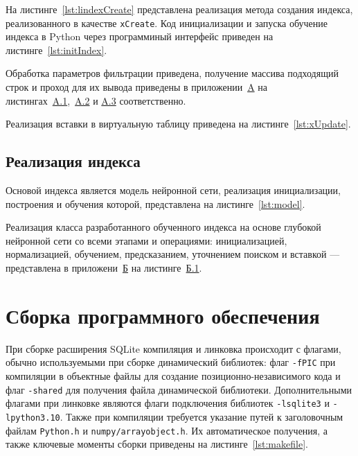 На листинге~\ref{lst:lindexCreate} представлена реализация метода создания
индекса, реализованного в качестве \texttt{xCreate}. Код инициализации и запуска
обучение индекса в Python через программиный интерфейс приведен на
листинге~\ref{lst:initIndex}.



Обработка параметров фильтрации приведена, получение массива подходящий строк и
проход для их вывода приведены в приложении~\hyperref[add1]{A} на
листингах~\hyperref[lst:xBestIndex]{A.1},~\hyperref[lst:xFilter]{A.2} и
\hyperref[lst:xSearch]{A.3} соответственно.

Реализация вставки в виртуальную таблицу приведена на
листинге~\ref{lst:xUpdate}.


\subsection{Реализация индекса}

Основой индекса является модель нейронной сети, реализация инициализации,
построения и обучения которой, представлена на листинге~\ref{lst:model}.


Реализация класса разработанного обученного индекса на основе глубокой нейронной
сети со всеми этапами и операциями: инициализацией, нормализацией, обучением,
предсказанием, уточнением поиском и вставкой --- представлена в
приложени~\hyperref[add2]{Б} на листинге~\hyperref[lst:lindex]{Б.1}.

\section{Сборка программного обеспечения}

При сборке расширения SQLite компиляция и линковка происходит с флагами,
обычно используемыми при сборке динамический библиотек: флаг \texttt{-fPIC} при
компиляции в объектные файлы для создание позиционно-независимого кода и флаг
\texttt{-shared} для получения файла динамической библиотеки. Дополнительными
флагами при линковке являются флаги подключения библиотек \texttt{-lsqlite3} и
\texttt{-lpython3.10}. Также при компиляции требуется указание путей к
заголовочным файлам \texttt{Python.h} и \texttt{numpy/arrayobject.h}. Их
автоматическое получения, а также ключевые моменты сборки приведены на
листинге~\ref{lst:makefile}.

